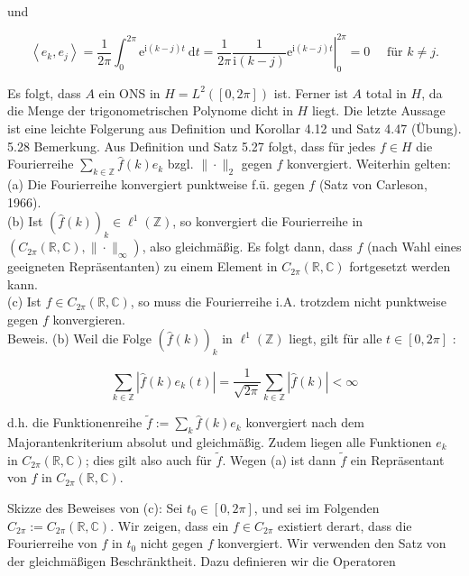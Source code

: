 \documentclass[10pt, letterpaper]{article}
\begin{document}
und

$$
\left\langle e_{k}, e_{j}\right\rangle=\frac{1}{2 \pi} \int_{0}^{2 \pi} \mathrm{e}^{\mathrm{i}(k-j) t} \mathrm{~d} t=\left.\frac{1}{2 \pi} \frac{1}{\mathrm{i}(k-j)} \mathrm{e}^{\mathrm{i}(k-j) t}\right|_{0} ^{2 \pi}=0 \quad \text { für } k \neq j .
$$

Es folgt, dass $A$ ein ONS in $H=L^{2}([0,2 \pi])$ ist. Ferner ist $A$ total in $H$, da die Menge der trigonometrischen Polynome dicht in $H$ liegt. Die letzte Aussage ist eine leichte Folgerung aus Definition und Korollar 4.12 und Satz 4.47 (Übung).\\
5.28 Bemerkung. Aus Definition und Satz 5.27 folgt, dass für jedes $f \in H$ die Fourierreihe $\sum_{k \in \mathbb{Z}} \hat{f}(k) e_{k}$ bzgl. $\|\cdot\|_{2}$ gegen $f$ konvergiert. Weiterhin gelten:\\
(a) Die Fourierreihe konvergiert punktweise f.ü. gegen $f$ (Satz von Carleson, 1966).\\
(b) Ist $(\hat{f}(k))_{k} \in \ell^{1}(\mathbb{Z})$, so konvergiert die Fourierreihe in $\left(C_{2 \pi}(\mathbb{R}, \mathbb{C}),\|\cdot\|_{\infty}\right)$, also gleichmäßig. Es folgt dann, dass $f$ (nach Wahl eines geeigneten Repräsentanten) zu einem Element in $C_{2 \pi}(\mathbb{R}, \mathbb{C})$ fortgesetzt werden kann.\\
(c) Ist $f \in C_{2 \pi}(\mathbb{R}, \mathbb{C})$, so muss die Fourierreihe i.A. trotzdem nicht punktweise gegen $f$ konvergieren.\\
Beweis. (b) Weil die Folge $(\hat{f}(k))_{k}$ in $\ell^{1}(\mathbb{Z})$ liegt, gilt für alle $t \in[0,2 \pi]$ :

$$
\sum_{k \in \mathbb{Z}}\left|\hat{f}(k) e_{k}(t)\right|=\frac{1}{\sqrt{2 \pi}} \sum_{k \in \mathbb{Z}}|\hat{f}(k)|<\infty
$$

d.h. die Funktionenreihe $\tilde{f}:=\sum_{k} \hat{f}(k) e_{k}$ konvergiert nach dem Majorantenkriterium absolut und gleichmäßig. Zudem liegen alle Funktionen $e_{k}$ in $C_{2 \pi}(\mathbb{R}, \mathbb{C})$; dies gilt also auch für $\tilde{f}$. Wegen (a) ist dann $\tilde{f}$ ein Repräsentant von $f$ in $C_{2 \pi}(\mathbb{R}, \mathbb{C})$.

Skizze des Beweises von (c): Sei $t_{0} \in[0,2 \pi]$, und sei im Folgenden $C_{2 \pi}:=C_{2 \pi}(\mathbb{R}, \mathbb{C})$. Wir zeigen, dass ein $f \in C_{2 \pi}$ existiert derart, dass die Fourierreihe von $f$ in $t_{0}$ nicht gegen $f$ konvergiert. Wir verwenden den Satz von der gleichmäßigen Beschränktheit. Dazu definieren wir die Operatoren
\end{document}
